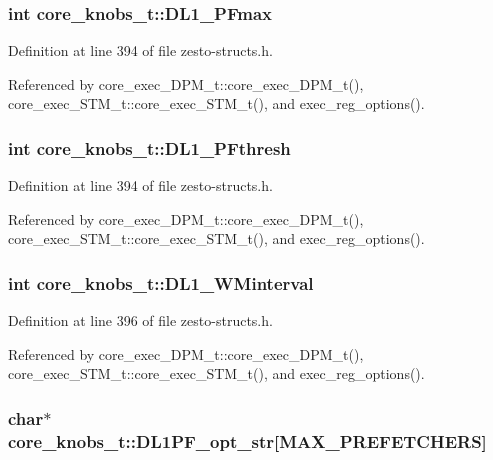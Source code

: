 \subsubsection[{DL1\_\-PFmax}]{\setlength{\rightskip}{0pt plus 5cm}int {\bf core\_\-knobs\_\-t::DL1\_\-PFmax}}\label{structcore__knobs__t_3a9c99e092f8473fd91c1428f39ed344}




Definition at line 394 of file zesto-structs.h.

Referenced by core\_\-exec\_\-DPM\_\-t::core\_\-exec\_\-DPM\_\-t(), core\_\-exec\_\-STM\_\-t::core\_\-exec\_\-STM\_\-t(), and exec\_\-reg\_\-options().
\subsubsection[{DL1\_\-PFthresh}]{\setlength{\rightskip}{0pt plus 5cm}int {\bf core\_\-knobs\_\-t::DL1\_\-PFthresh}}\label{structcore__knobs__t_7403e7f5317b6f4e5c803b34e1fde836}




Definition at line 394 of file zesto-structs.h.

Referenced by core\_\-exec\_\-DPM\_\-t::core\_\-exec\_\-DPM\_\-t(), core\_\-exec\_\-STM\_\-t::core\_\-exec\_\-STM\_\-t(), and exec\_\-reg\_\-options().
\subsubsection[{DL1\_\-WMinterval}]{\setlength{\rightskip}{0pt plus 5cm}int {\bf core\_\-knobs\_\-t::DL1\_\-WMinterval}}\label{structcore__knobs__t_99ea66c8d39b0341339324532e76f913}




Definition at line 396 of file zesto-structs.h.

Referenced by core\_\-exec\_\-DPM\_\-t::core\_\-exec\_\-DPM\_\-t(), core\_\-exec\_\-STM\_\-t::core\_\-exec\_\-STM\_\-t(), and exec\_\-reg\_\-options().
\subsubsection[{DL1PF\_\-opt\_\-str}]{\setlength{\rightskip}{0pt plus 5cm}char$\ast$ {\bf core\_\-knobs\_\-t::DL1PF\_\-opt\_\-str}[MAX\_\-PREFETCHERS]}\label{structcore__knobs__t_35a66a170baf0e1b69bd3d531150b14a}




